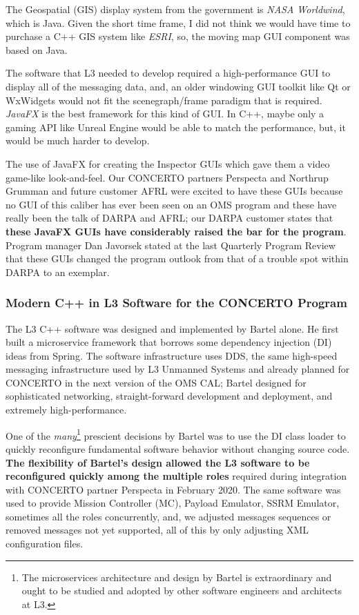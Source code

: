 \documentclass[letterpaper,11pt]{texMemo} %
\begin{document}
The Geospatial (GIS) display system from the government is \emph{NASA Worldwind}, which is Java.  Given the short time frame, I did not think we would have time to purchase a C++ GIS system like \emph{ESRI}, so, the moving map GUI component was based on Java.


The software that L3 needed to develop required a high-performance GUI to display all of the messaging data, and, an older windowing GUI toolkit like Qt or WxWidgets would not fit the scenegraph/frame paradigm that is required.  \emph{JavaFX} is the best framework for this kind of GUI.
In C++, maybe only a gaming API like Unreal Engine would be able to match the performance, but, it would be much harder to develop.

The use of JavaFX for creating the Inspector GUIs which gave them a video game-like look-and-feel.
Our CONCERTO partners Perspecta and Northrup Grumman and future customer AFRL were excited to have these GUIs because no GUI of this caliber has ever been seen on an OMS program and these have really been the talk of DARPA and AFRL; our DARPA customer states that  \textbf{these JavaFX GUIs have considerably raised the bar for the program}.
Program manager Dan Javorsek stated at the last Quarterly Program Review that these GUIs changed the program outlook from that of a trouble spot within DARPA to an exemplar.


\subsubsection*{Modern C++ in L3 Software for the CONCERTO Program}
The L3 C++ software was designed and implemented by Bartel alone.
He first built a microservice framework that borrows some dependency injection (DI) ideas from Spring.
The software infrastructure uses DDS, the same high-speed messaging infrastructure used by L3 Unmanned Systems and already planned for CONCERTO in the next version of the OMS CAL; Bartel designed for sophisticated networking, straight-forward development and deployment, and extremely high-performance.

One of the \emph{many}\footnote{The microservices architecture and design by Bartel is extraordinary and ought to be studied and adopted by other software engineers and architects at L3.} prescient decisions by Bartel was to use the DI class loader to quickly reconfigure fundamental software behavior without changing source code.
\textbf{The flexibility of Bartel's design allowed the L3 software to be reconfigured quickly among the multiple roles} required during integration with CONCERTO partner Perspecta in February 2020.
The same software was used to provide Mission Controller (MC), Payload Emulator, SSRM Emulator, sometimes all the roles concurrently, and, we adjusted messages sequences or removed messages not yet supported, all of this by only adjusting XML configuration files.
\end{document}
